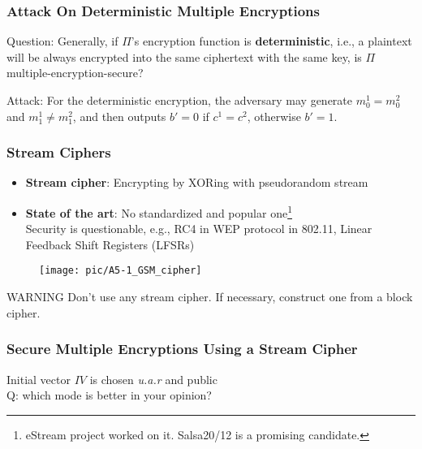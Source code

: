 \begin{frame}\frametitle{Attack On Deterministic Multiple Encryptions}
\begin{alertblock}{Question:}
Generally, if $\Pi$'s encryption function is \textbf{deterministic}, i.e., a plaintext will be always encrypted into the same ciphertext with the same key, is $\Pi$ multiple-encryption-secure?
\end{alertblock}

\begin{exampleblock}{Attack:}
For the deterministic encryption, the adversary may generate $m_0^1 = m_0^2$ and $m_1^1 \neq m_1^2$, and then outputs $b'=0$ if $c^1 = c^2$, otherwise $b'=1$.
\end{exampleblock}
\end{frame}
\begin{frame}\frametitle{Stream Ciphers}
\begin{itemize}
\item \textbf{Stream cipher}: Encrypting by XORing with pseudorandom stream
\item \textbf{State of the art}: No standardized and popular one\footnote{eStream project worked on it. Salsa20/12 is a promising candidate.}\\ Security is questionable, e.g., RC4 in WEP protocol in 802.11, Linear Feedback Shift Registers (LFSRs)
\end{itemize}
\begin{figure}
\begin{center}
\texttt{[image: pic/A5-1\_GSM\_cipher]} 
\end{center}
\end{figure}
\begin{alertblock}{WARNING}
Don't use any stream cipher. If necessary, construct one from a block cipher.
\end{alertblock}
\end{frame}
\begin{frame}\frametitle{Secure Multiple Encryptions Using a Stream Cipher}
\begin{figure}
\begin{center}

\end{center}
\end{figure}
Initial vector $IV$ is chosen \emph{u.a.r} and public\\
\alert{Q: which mode is better in your opinion?}
\end{frame}
